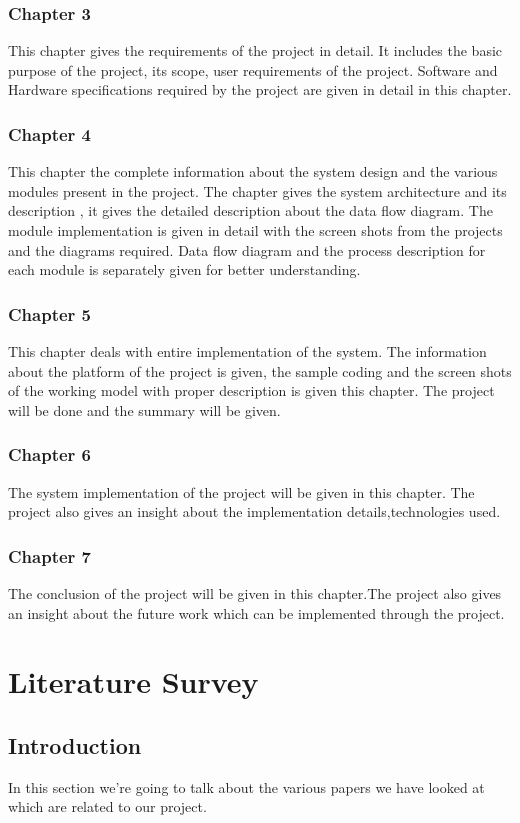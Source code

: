 \documentclass[BTech]{srmuthesis}
\begin{document}
\subsection*{Chapter 3}
This chapter gives the requirements of the project in detail. It includes the basic purpose of the project, its scope, user requirements of the project. Software and Hardware specifications required by the project are given in detail in this chapter.

\subsection*{Chapter 4}
This chapter the complete information about the system design and the various modules present in the project. The chapter gives the system architecture and its description , it gives the detailed description about the data flow diagram. The module implementation is given in detail with the screen shots from the projects and the diagrams required. Data flow diagram and the process description for each module is separately given for better understanding.

\subsection*{Chapter 5}
This chapter deals with entire implementation of the system. The information about the platform of the project is given, the sample coding and the screen shots of the working model with proper description is given this chapter. The project will be done and the summary will be given.
\subsection*{Chapter 6}
The system implementation of the project will be given in this chapter. The project also gives an insight
about the implementation details,technologies used.
\subsection*{Chapter 7}
The conclusion of the project will be given in this chapter.The project also gives an insight about the future work which can be implemented through the project.

\chapter{Literature Survey}
\section{Introduction}
In this section we're going to talk about the various papers we have looked at which are related to our project.
\end{document}
